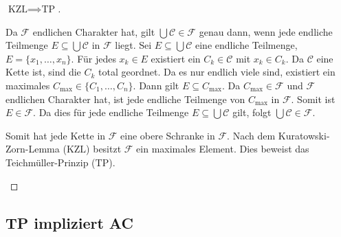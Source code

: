 \begin{proof}[$\text{KZL} \implies \text{TP}$]
\begin{math-stroke}
Da $\mathcal{F}$ endlichen Charakter hat, gilt $\bigcup \mathcal{C} \in \mathcal{F}$ genau dann, wenn jede endliche Teilmenge $E \subseteq \bigcup \mathcal{C}$ in $\mathcal{F}$ liegt.
Sei $E \subseteq \bigcup \mathcal{C}$ eine endliche Teilmenge, $E = \{x_1, \dots, x_n\}$.
Für jedes $x_k \in E$ existiert ein $C_k \in \mathcal{C}$ mit $x_k \in C_k$.
Da $\mathcal{C}$ eine Kette ist, sind die $C_k$ total geordnet. Da es nur endlich viele sind, existiert ein maximales $C_{\text{max}} \in \{C_1, \dots, C_n\}$.
Dann gilt $E \subseteq C_{\text{max}}$.
Da $C_{\text{max}} \in \mathcal{F}$ und $\mathcal{F}$ endlichen Charakter hat, ist jede endliche Teilmenge von $C_{\text{max}}$ in $\mathcal{F}$.
Somit ist $E \in \mathcal{F}$.
Da dies für jede endliche Teilmenge $E \subseteq \bigcup \mathcal{C}$ gilt, folgt $\bigcup \mathcal{C} \in \mathcal{F}$.

Somit hat jede Kette in $\mathcal{F}$ eine obere Schranke in $\mathcal{F}$.
Nach dem Kuratowski-Zorn-Lemma ($\text{KZL}$) besitzt $\mathcal{F}$ ein maximales Element.
Dies beweist das Teichmüller-Prinzip ($\text{TP}$).
\end{math-stroke}
\end{proof}

\begin{ai-global-state-checkpoint-invisible-content}
\end{ai-global-state-checkpoint-invisible-content}

\subsection{TP impliziert AC}

